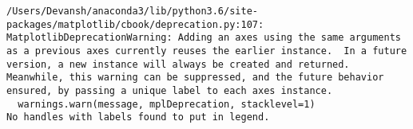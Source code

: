 \documentclass[11pt]{article}
\begin{document}
    \begin{Verbatim}[commandchars=\\\{\}]
/Users/Devansh/anaconda3/lib/python3.6/site-packages/matplotlib/cbook/deprecation.py:107: MatplotlibDeprecationWarning: Adding an axes using the same arguments as a previous axes currently reuses the earlier instance.  In a future version, a new instance will always be created and returned.  Meanwhile, this warning can be suppressed, and the future behavior ensured, by passing a unique label to each axes instance.
  warnings.warn(message, mplDeprecation, stacklevel=1)
No handles with labels found to put in legend.

    \end{Verbatim}

    \begin{center}
    \end{center}
    { \hspace*{\fill} \\}
    
    \begin{center}
    \end{center}
    { \hspace*{\fill} \\}
    
    \begin{center}
    \end{center}
    { \hspace*{\fill} \\}
    
    \begin{center}
    \end{center}
    { \hspace*{\fill} \\}
    
    \begin{center}
    \end{center}
    { \hspace*{\fill} \\}
    
    \begin{center}
    \end{center}
    { \hspace*{\fill} \\}
    
\end{document}
